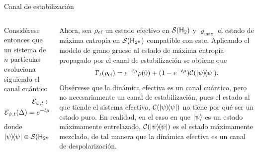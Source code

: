 \begin{frame}{Canal de estabilización}
    \begin{columns}
        \begin{column}{0.5\textwidth}
            Considérese entonces que un sistema de $n$ partículas evoluciona siguiendo el canal cuántico
\begin{gather}
    \mcE_{\psi,t}:\mcB(\hilbert_{2^{n}}) \rightarrow \mcB(\hilbert_{2^{n}})\nonumber\\
    \mcE_{\psi,t}(\Delta)=e^{-t\mu}\varrho+(1-e^{-t \mu})\dyad{\psi}\Tr(\Delta)\rlap{.}\nonumber
\end{gather}
donde $\dyad{\psi}\in \densityspace{2^{n}}$
        \end{column}
        \begin{column}{0.5\textwidth}
            Ahora, sea $\rho_{\text{ef}}$ un estado efectivo en $\mathcal{S}({\sf H}_{2})$ y $\varrho_{\max}$ el estado de máxima entropía en $\mathcal{S}({\sf H}_{2^{n}})$ compatible con este. Aplicando el modelo de grano grueso al estado de máxima entropía propagado por el canal de estabilización se obtiene que
\begin{equation}\label{eq:EffectiveStabilizing}
    \Gamma_{t}(\rho_{\ef})=e^{-t\mu}\rho(0)+(1-e^{-t \mu})\mcC(\dyad{\psi}).\nonumber
\end{equation}
Obsérvese que la dinámica efectiva es un canal cuántico, pero no necesariamente un canal de estabilización, pues el estado al que tiende el sistema efectivo, $\mcC(\dyad{\psi})$ no tiene por qué ser un estado puro. En realidad, en el caso en que $\ket{\psi}$ es un estado máximamente entrelazado, $\mcC(\dyad{\psi})$ es el estado máximamente mezclado, de tal manera que la dinámica efectiva es un canal de despolarización.
        \end{column}
    \end{columns}
\end{frame}


